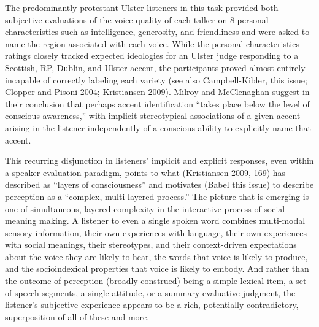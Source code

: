 \documentclass[
  letterpaper,
  DIV=11,
  numbers=noendperiod]{scrartcl}
\begin{document}
The predominantly protestant Ulster listeners in this task provided both
subjective evaluations of the voice quality of each talker on 8 personal
characteristics such as intelligence, generosity, and friendliness and
were asked to name the region associated with each voice. While the
personal characteristics ratings closely tracked expected ideologies for
an Ulster judge responding to a Scottish, RP, Dublin, and Ulster accent,
the participants proved almost entirely incapable of correctly labeling
each variety (see also Campbell-Kibler, this issue; Clopper and Pisoni
2004; Kristiansen 2009). Milroy and McClenaghan suggest in their
conclusion that perhaps accent identification ``takes place below the
level of conscious awareness,'' with implicit stereotypical associations
of a given accent arising in the listener independently of a conscious
ability to explicitly name that accent.

This recurring disjunction in listeners' implicit and explicit
responses, even within a speaker evaluation paradigm, points to what
(Kristiansen 2009, 169) has described as ``layers of consciousness'' and
motivates (Babel this issue) to describe perception as a ``complex,
multi-layered process.'' The picture that is emerging is one of
simultaneous, layered complexity in the interactive process of social
meaning making. A listener to even a single spoken word combines
multi-modal sensory information, their own experiences with language,
their own experiences with social meanings, their stereotypes, and their
context-driven expectations about the voice they are likely to hear, the
words that voice is likely to produce, and the socioindexical properties
that voice is likely to embody. And rather than the outcome of
perception (broadly construed) being a simple lexical item, a set of
speech segments, a single attitude, or a summary evaluative judgment,
the listener's subjective experience appears to be a rich, potentially
contradictory, superposition of all of these and more.
\end{document}
